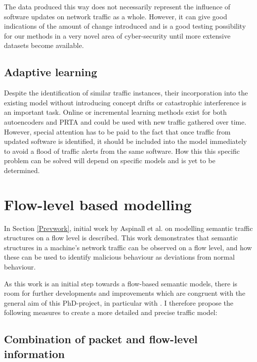 \documentclass[a4paper,12pt,twoside]{report}
\begin{document}
The data produced this way does not necessarily represent the influence of software updates on network traffic as a whole. However, it can give good indications of the amount of change introduced and is a good testing possibility for our methods in a very novel area of cyber-security until more extensive datasets become available. 

\subsection{Adaptive learning}
Despite the identification of similar traffic instances, their incorporation into the existing model without introducing concept drifts or catastrophic interference is an important task. Online or incremental learning methods exist for both autoencoders and PRTA and could be used with new traffic gathered over time. However, special attention has to be paid to the fact that once traffic from updated software is identified, it should be included into the model immediately to avoid a flood of traffic alerts from the same software. How this this specific problem can be solved will depend on specific models and is yet to be determined.

\section{Flow-level based modelling}\label{Curmet}



In Section \ref{Prevwork}, initial work by Aspinall et al. on modelling semantic traffic structures on a flow level is described. This work demonstrates that semantic structures in a machine's network traffic can be observed on a flow level, and how these can be used to identify malicious behaviour as deviations from normal behaviour.

As this work is an initial step towards a flow-based semantic models, there is room for further developments and improvements which are congruent  with the general aim of this PhD-project, in particular with . I therefore propose the following measures to create a more detailed and precise traffic model:




\subsection{Combination of packet and flow-level information}
\end{document}
